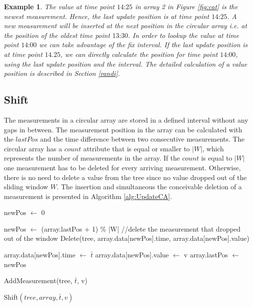 \documentclass[abstracton,12pt,oneside]{scrreprt}
\newtheorem{example}{Example}
\begin{document}
\begin{example}
	The value at time point $\text{14:25}$ in array 2 in Figure \ref{fig:cat} is the newest measurement. Hence, the last update position is at time point $\text{14:25}$. A new measurement will be inserted at the next position in the circular array i.e. at the position of the oldest time point $\text{13:30}$. In order to lookup the value at time point $\text{14:00}$ we can take advantage of the fix interval. If the last update position is at time point $\text{14.25}$, we can directly calculate the position for time point $\text{14:00}$, using the last update position and the interval. The detailed calculation of a value position is described in Section \ref{randi}.
\end{example} 

\subsection{Shift}
\label{shifti}
The measurements in a circular array are stored in a defined interval without any gaps in between. The measurement position in the array can be calculated with the $lastPos$ and the time difference between two consecutive measurements. The circular array has a $count$ attribute that is equal or smaller to $|W|$, which represents the number of measurements in the array. If the $count$ is equal to $|W|$ one measurement has to be deleted for every arriving measurement. Otherwise, there is no need to delete a value from the tree since no value dropped out of the sliding window $W$. The insertion and simultaneous the conceivable deletion of a measurement is presented in Algorithm \ref{alg:UpdateCA}. 

\BlankLine
\begin{algorithm}[H]
	\IncMargin{1em}
	\SetAlgoLined
	\DontPrintSemicolon
	
	
	newPos $\leftarrow$ 0\;
	
	{
		newPos $\leftarrow$ (array.lastPos + 1) \% |W|\;
		//delete the measurement that dropped out of the window
		Delete(tree, array.data[newPos].time, array.data[newPos].value)\;
		
	}
	
	array.data[newPos].time $\leftarrow$ $\bar{t}$\;
	array.data[newPos].value $\leftarrow$ v\;
	array.lastPos $\leftarrow$ newPos\;
	
	AddMeasurement(tree, $\bar{t}$, v)\;
	
	
	\caption{Shift$(tree, array, \bar{t}, v)$}
	\label{alg:UpdateCA}
\end{algorithm}
\end{document}

